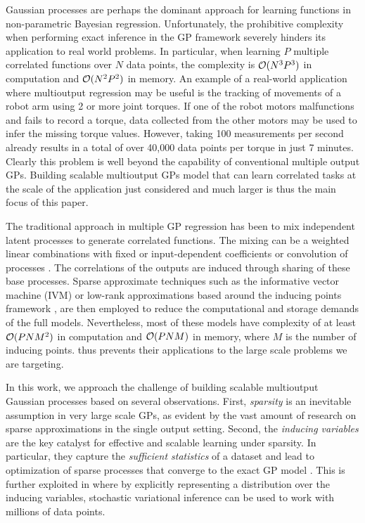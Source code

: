 Gaussian processes \citep[GPs,][]{rasmussen-williams-book} are perhaps the dominant approach for learning functions in non-parametric Bayesian regression.
Unfortunately, the prohibitive complexity when performing exact inference in the GP framework severely hinders its application to real world problems. 
In particular, when learning $P$ multiple correlated functions over $N$ data points, the complexity is $\mathcal{O}(N^3P^3)$ in computation and $\mathcal{O}(N^2P^2)$ in memory.
An example of a real-world application where multioutput regression may be useful is the tracking of  movements of a robot arm using 2 or more joint torques. 
If one of the robot motors malfunctions and fails to record a torque, data collected from the other motors may be used to infer the missing torque values.
However, taking 100 measurements per second already results in a total of over 40,000 data points per torque in just 7 minutes.
Clearly this problem is well beyond the capability of conventional multiple output GPs.
Building scalable multioutput GPs model that can learn correlated tasks at the scale of the application just considered and much larger is thus the main focus of this paper.

The traditional approach in multiple GP regression has been to mix independent latent processes to generate correlated functions.
The mixing can be a weighted linear combinations with fixed \citep{teh-et-al-aistats-05,bonilla-et-al-nips-08} or input-dependent \citep{wilson-et-al-icml-12,nguyen2013efficient} coefficients or convolution of processes \citep{boyle-frean-nips-05,alvarez-lawrence-nips-08}.
The correlations of the outputs are induced through sharing of these base processes.
Sparse approximate techniques such as the informative vector machine (IVM) \cite{lawrence2002fast} or low-rank approximations based around the inducing points framework \citep{quinonero2005unifying},
are then employed to reduce the computational and storage demands of the full models.
Nevertheless, most of these models have complexity of at least $\mathcal{O}(PNM^2)$ in computation and $\mathcal{O}(PNM)$ in memory, where $M$ is the number of inducing points.
thus prevents their applications to the  large scale problems we are targeting.

In this work, we approach the challenge of building scalable multioutput Gaussian processes based on several observations.
First, \emph{sparsity} is an inevitable assumption in very large scale GPs, as evident by the vast amount of research on sparse approximations in the single output setting. %
Second, the \emph{inducing variables} are the key catalyst for effective and scalable learning under sparsity.
In particular, they capture the \emph{sufficient statistics} of a dataset and lead to optimization of sparse processes that converge to the exact GP model \citep{titsias2009variational}.
This is further exploited in \cite{hensmangaussian} where by explicitly representing a distribution over the inducing variables, stochastic variational inference can be used to work with millions of data points.

